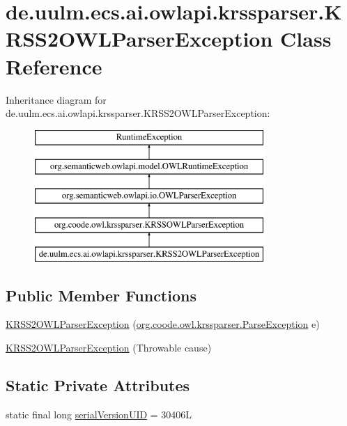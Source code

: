 \hypertarget{classde_1_1uulm_1_1ecs_1_1ai_1_1owlapi_1_1krssparser_1_1_k_r_s_s2_o_w_l_parser_exception}{\section{de.\-uulm.\-ecs.\-ai.\-owlapi.\-krssparser.\-K\-R\-S\-S2\-O\-W\-L\-Parser\-Exception Class Reference}
\label{classde_1_1uulm_1_1ecs_1_1ai_1_1owlapi_1_1krssparser_1_1_k_r_s_s2_o_w_l_parser_exception}
}
Inheritance diagram for de.\-uulm.\-ecs.\-ai.\-owlapi.\-krssparser.\-K\-R\-S\-S2\-O\-W\-L\-Parser\-Exception\-:\begin{figure}[H]
\begin{center}
\leavevmode
\includegraphics[height=5.000000cm]{classde_1_1uulm_1_1ecs_1_1ai_1_1owlapi_1_1krssparser_1_1_k_r_s_s2_o_w_l_parser_exception}
\end{center}
\end{figure}
\subsection*{Public Member Functions}
\begin{DoxyCompactItemize}
\item 
\hyperlink{classde_1_1uulm_1_1ecs_1_1ai_1_1owlapi_1_1krssparser_1_1_k_r_s_s2_o_w_l_parser_exception_a5cf6067cd8213358b7b55e0ad09325a2}{K\-R\-S\-S2\-O\-W\-L\-Parser\-Exception} (\hyperlink{classorg_1_1coode_1_1owl_1_1krssparser_1_1_parse_exception}{org.\-coode.\-owl.\-krssparser.\-Parse\-Exception} e)
\item 
\hyperlink{classde_1_1uulm_1_1ecs_1_1ai_1_1owlapi_1_1krssparser_1_1_k_r_s_s2_o_w_l_parser_exception_ad141eded5ad1dd2dc425fbf8b37c2a88}{K\-R\-S\-S2\-O\-W\-L\-Parser\-Exception} (Throwable cause)
\end{DoxyCompactItemize}
\subsection*{Static Private Attributes}
\begin{DoxyCompactItemize}
\item 
static final long \hyperlink{classde_1_1uulm_1_1ecs_1_1ai_1_1owlapi_1_1krssparser_1_1_k_r_s_s2_o_w_l_parser_exception_a028bce7fbb4200eacd8b5dd16eec62c2}{serial\-Version\-U\-I\-D} = 30406\-L
\end{DoxyCompactItemize}


